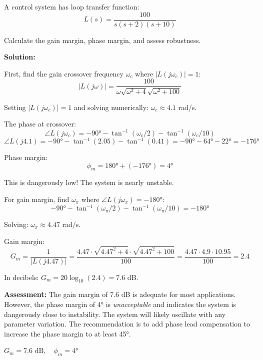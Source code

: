 \begin{examplebox}
A control system has loop transfer function:
\begin{equation*}
L(s) = \frac{100}{s(s+2)(s+10)}
\end{equation*}

Calculate the gain margin, phase margin, and assess robustness.

\textbf{Solution:}

First, find the gain crossover frequency $\omega_c$ where $|L(j\omega_c)| = 1$:
\begin{equation*}
|L(j\omega)| = \frac{100}{\omega \sqrt{\omega^2 + 4} \sqrt{\omega^2 + 100}}
\end{equation*}

Setting $|L(j\omega_c)| = 1$ and solving numerically: $\omega_c \approx 4.1$ rad/s.

The phase at crossover:
\begin{equation*}
\angle L(j\omega_c) = -90° - \tan^{-1}(\omega_c/2) - \tan^{-1}(\omega_c/10)
\end{equation*}
\begin{equation*}
\angle L(j4.1) = -90° - \tan^{-1}(2.05) - \tan^{-1}(0.41) = -90° - 64° - 22° = -176°
\end{equation*}

Phase margin:
\begin{equation*}
\phi_m = 180° + (-176°) = 4°
\end{equation*}

This is dangerously low! The system is nearly unstable.

For gain margin, find $\omega_\pi$ where $\angle L(j\omega_\pi) = -180°$:
\begin{equation*}
-90° - \tan^{-1}(\omega_\pi/2) - \tan^{-1}(\omega_\pi/10) = -180°
\end{equation*}

Solving: $\omega_\pi \approx 4.47$ rad/s.

Gain margin:
\begin{equation*}
G_m = \frac{1}{|L(j4.47)|} = \frac{4.47 \cdot \sqrt{4.47^2+4} \cdot \sqrt{4.47^2+100}}{100} = \frac{4.47 \cdot 4.9 \cdot 10.95}{100} = 2.4
\end{equation*}

In decibels: $G_m = 20\log_{10}(2.4) = 7.6$ dB.

\textbf{Assessment:} The gain margin of 7.6 dB is adequate for most applications. However, the phase margin of 4° is \textit{unacceptable} and indicates the system is dangerously close to instability. The system will likely oscillate with any parameter variation. The recommendation is to add phase lead compensation to increase the phase margin to at least 45°.

$\boxed{G_m = 7.6 \text{ dB}, \quad \phi_m = 4°}$
\end{examplebox}

